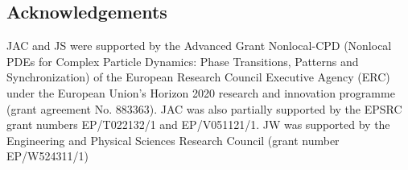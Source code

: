 \documentclass[reqno, 11pt]{amsart}
\numberwithin{equation}{section}
\theoremstyle{definition}
\begin{document}
\subsection*{Acknowledgements}
JAC and JS were supported by the Advanced Grant Nonlocal-CPD (Nonlocal PDEs for Complex Particle Dynamics: Phase Transitions, Patterns and Synchronization) of the European Research Council Executive Agency (ERC) under the European Union’s Horizon 2020 research and innovation programme (grant agreement No. 883363). JAC was also partially supported by the EPSRC grant numbers EP/T022132/1 and EP/V051121/1. JW was supported by the Engineering and Physical Sciences Research Council (grant number EP/W524311/1)



\end{document}
